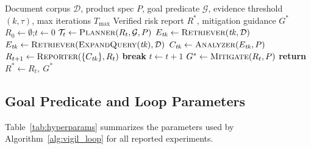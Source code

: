 \begin{algorithm}[h]
\caption{VIGIL Goal-Conditioned Agentic Loop}
\label{alg:vigil_loop}
\begin{algorithmic}[1]
\REQUIRE Document corpus $\mathcal{D}$, product spec $P$, goal predicate $\mathcal{G}$, evidence threshold $(k,\tau)$, max iterations $T_{\max}$
\ENSURE Verified risk report $R^*$, mitigation guidance $G^*$
\STATE $R_0 \gets \emptyset$;\quad $t \gets 0$
  \STATE $\mathcal{T}_t \gets \textsc{Planner}(R_t, \mathcal{G}, P)$ 
    \STATE $E_{\mathit{tk}} \gets \textsc{Retriever}(\mathit{tk},\mathcal{D})$ 
      \STATE $E_{\mathit{tk}} \gets \textsc{Retriever}(\textsc{ExpandQuery}(\mathit{tk}),\mathcal{D})$
    \ENDIF
    \STATE $C_{\mathit{tk}} \gets \textsc{Analyzer}(E_{\mathit{tk}}, P)$ 
  \ENDFOR
  \STATE $R_{t+1} \gets \textsc{Reporter}(\{C_{\mathit{tk}}\}, R_t)$
    \STATE \textbf{break}
  \ENDIF
  \STATE $t \gets t+1$
\ENDWHILE
\STATE $G^* \gets \textsc{Mitigate}(R_t, P)$ 
\STATE \textbf{return} $R^* \gets R_t,\ G^*$
\end{algorithmic}
\end{algorithm}

\subsection{Goal Predicate and Loop Parameters}

Table~\ref{tab:hyperparams} summarizes the parameters used by Algorithm~\ref{alg:vigil_loop} for all reported experiments.


